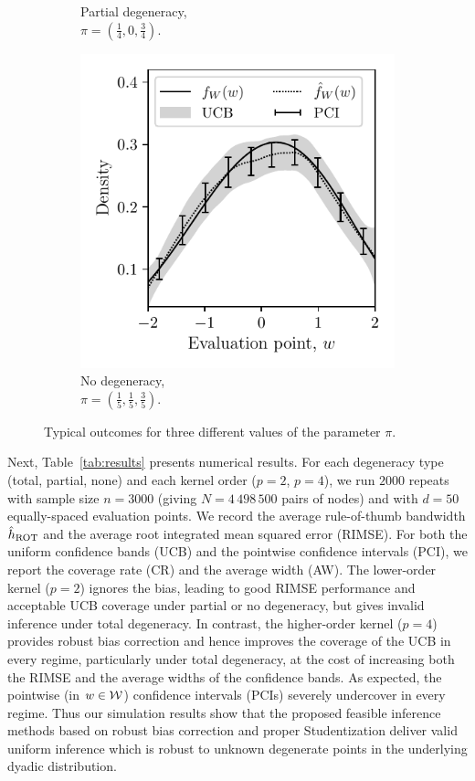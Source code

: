 \begin{figure}[ht]
\begin{subfigure}{0.32\textwidth}
    \caption{Partial degeneracy, \\
    $\pi = \left( \frac{1}{4}, 0, \frac{3}{4} \right)$.}
  \end{subfigure}
  \begin{subfigure}{0.32\textwidth}
    \centering
    \includegraphics[scale=0.64]{graphics/outcome_plot_none.pdf}
    \caption{No degeneracy, \\
    $\pi = \left( \frac{1}{5}, \frac{1}{5}, \frac{3}{5} \right)$.}
  \end{subfigure}
  \caption[Typical outcomes for different values of the parameter $\pi$]
  {Typical outcomes for three different values of the parameter $\pi$.}
  \label{fig:results}
\end{figure}

Next, Table~\ref{tab:results} presents numerical results. For each degeneracy
type (total, partial, none) and each kernel order ($p=2$, $p=4$), we run $2000$
repeats with sample size $n=3000$ (giving $N=4\,498\,500$ pairs of nodes) and
with $d=50$ equally-spaced evaluation points. We record the average
rule-of-thumb bandwidth $\hat{h}_{\operatorname{ROT}}$ and the average root integrated mean
squared error (RIMSE). For both the uniform confidence bands (UCB) and the
pointwise confidence intervals (PCI), we report the coverage rate (CR) and the
average width (AW).
%
The lower-order kernel ($p=2$) ignores the bias, leading to good RIMSE
performance and acceptable UCB coverage under partial or no degeneracy, but
gives invalid inference under total degeneracy. In contrast, the higher-order
kernel ($p=4$) provides robust bias correction and hence improves the coverage
of the UCB in every regime, particularly under total degeneracy, at the cost of
increasing both the RIMSE and the average widths of the confidence bands.
%
As expected, the pointwise (in $w\in\mathcal{W}$) confidence intervals (PCIs) severely
undercover in every regime. Thus our simulation results show that the proposed
feasible inference methods based on robust bias correction and proper
Studentization deliver valid uniform inference which is robust to unknown
degenerate points in the underlying dyadic distribution.

